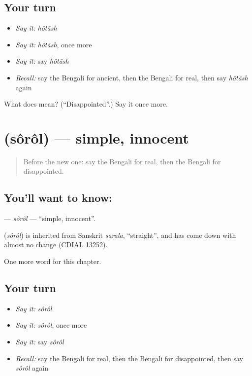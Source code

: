 \subsection*{Your turn}
\begin{itemize}
\raggedright
  \item \emph{Say it:} \emph{hôtāsh}
  \item \emph{Say it:} \emph{hôtāsh}, once more
  \item \emph{Say it:} say \emph{hôtāsh}
  \item \emph{Recall:} say the Bengali for ancient, then the Bengali for real, then say \emph{hôtāsh} again
\end{itemize}

\begin{tcolorbox}[breakable,colback=teal!4,colframe=teal!35!black,title={Before you move on}]
What does  mean? (\textquotedblleft{}Disappointed\textquotedblright{}.) Say it once more.
\end{tcolorbox}
\section[\texorpdfstring{\bn{সরল} (sôrôl)}{সরল (sôrôl)}]{ (sôrôl) — simple, innocent}

\label{lesson:BN-C192-sorol}



\begin{quote}
Before the new one: say the Bengali for real, then the Bengali for disappointed.
\end{quote}

\subsection*{You'll want to know: }
\textbf{} — \emph{sôrôl} — \textquotedblleft{}simple, innocent\textquotedblright{}.

\begin{cousinweb}
\textbf{} (\emph{sôrôl}) is inherited from Sanskrit \emph{sarala}, \textquotedblleft{}straight\textquotedblright{}, and has come down with almost no change (CDIAL 13252).
\end{cousinweb}

\begin{grammarlens}[title={What you've built}]
One more word for this chapter.
\end{grammarlens}

\subsection*{Your turn}
\begin{itemize}
\raggedright
  \item \emph{Say it:} \emph{sôrôl}
  \item \emph{Say it:} \emph{sôrôl}, once more
  \item \emph{Say it:} say \emph{sôrôl}
  \item \emph{Recall:} say the Bengali for real, then the Bengali for disappointed, then say \emph{sôrôl} again
\end{itemize}

